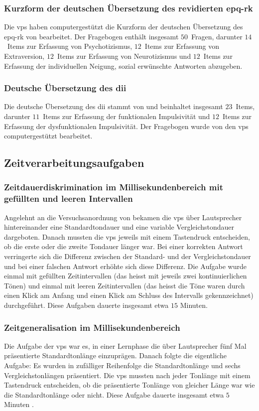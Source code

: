 \documentclass[11pt, twoside, a4paper]{book}		%
\begin{document}
\subsubsection*{Kurzform der deutschen Übersetzung des revidierten \gls{epq-rk}}
Die \glspl{vp} haben  computergestützt die Kurzform der deutschen Übersetzung des \gls{epq-rk} von \citet{Ruch1999} bearbeitet. Der Fragebogen enthält insgesamt $50$~Fragen, darunter $14$~Items zur Erfassung von Psychotizismus, $12$~Items zur Erfassung von Extraversion, $12$~Items zur Erfassung von Neurotizismus und $12$~Items zur Erfassung der individuellen Neigung, sozial erwünschte Antworten abzugeben.

\subsubsection*{Deutsche Übersetzung des \gls{dii}}
Die deutsche Übersetzung des \gls{dii} stammt von \citet{Kuhmann1996} und beinhaltet insgesamt $23$~Items, darunter $11$~Items zur Erfassung der funktionalen Impulsivität und  $12$~Items zur Erfassung der dysfunktionalen Impulsivität. Der Fragebogen wurde von den \glspl{vp} computergestützt bearbeitet.

\subsection{Zeitverarbeitungsaufgaben}

\subsubsection*{Zeitdauerdiskrimination im Millisekundenbereich mit gefüllten und leeren Intervallen}
Angelehnt an die Versuchsanordnung von \citet{Stauffer2012} bekamen die \glspl{vp} über Lautsprecher hintereinander eine Standardtondauer und eine variable Vergleichstondauer dargeboten. Danach mussten die \glspl{vp} jeweils mit einem Tastendruck entscheiden, ob die erste oder die zweite Tondauer länger war. Bei einer korrekten Antwort verringerte sich die Differenz zwischen der Standard- und der Vergleichstondauer und bei einer falschen Antwort erhöhte sich diese Differenz. Die Aufgabe wurde einmal mit gefüllten Zeitintervallen (das heisst mit jeweils zwei kontinuierlichen Tönen) und einmal mit leeren Zeitintervallen (das heisst die Töne waren durch einen Klick am Anfang und einen Klick am Schluss des Intervalls gekennzeichnet) durchgeführt. Diese Aufgaben dauerte insgesamt etwa $15$ Minuten.

\subsubsection*{Zeitgeneralisation im Millisekundenbereich}
Die Aufgabe der \glspl{vp} war es, in einer Lernphase die über Lautsprecher fünf Mal präsentierte Standardtonlänge einzuprägen. Danach folgte die eigentliche Aufgabe: Es wurden in zufälliger Reihenfolge die Standardtonlänge und sechs Vergleichstonlängen präsentiert. Die \glspl{vp} mussten nach jeder Tonlänge mit einem Tastendruck entscheiden, ob die präsentierte Tonlänge von gleicher Länge war wie die Standardtonlänge oder nicht. Diese Aufgabe dauerte insgesamt etwa $5$ Minuten \citep[in Anlehnung an][]{Stauffer2012}.
\end{document}
